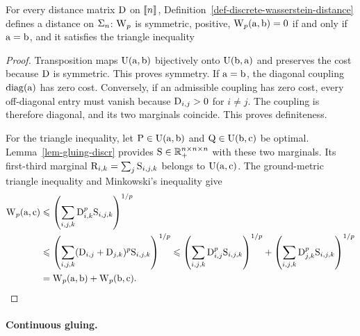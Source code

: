 \begin{prop}\label{prop-metric-histo}
	For every distance matrix $\mathrm{D}$ on $\llbracket n\rrbracket$, Definition~\ref{def-discrete-wasserstein-distance} defines a distance on $\Sigma_n$: $\operatorname{\mathrm{W}}_p$ is symmetric, positive, $\operatorname{\mathrm{W}}_p(\mathrm{a},\mathrm{b})=0$ if and only if $\mathrm{a} = \mathrm{b}$, and it satisfies the triangle inequality
\end{prop}

\begin{proof}
	Transposition maps $\mathrm{U}(\mathrm{a},\mathrm{b})$ bijectively onto $\mathrm{U}(\mathrm{b},\mathrm{a})$ and preserves the cost because $\mathrm{D}$ is symmetric. This proves symmetry. If $\mathrm{a}=\mathrm{b}$, the diagonal coupling $\operatorname{diag}(\mathrm{a})$ has zero cost. Conversely, if an admissible coupling has zero cost, every off-diagonal entry must vanish because $\mathrm{D}_{i,j}>0$ for $i\neq j$. The coupling is therefore diagonal, and its two marginals coincide. This proves definiteness.

	For the triangle inequality, let $\mathrm{P}\in\mathrm{U}(\mathrm{a},\mathrm{b})$ and $\mathrm{Q}\in\mathrm{U}(\mathrm{b},\mathrm{c})$ be optimal. Lemma~\ref{lem-gluing-discr} provides $\mathrm{S}\in\mathbb{R}_+^{n\times n\times n}$ with these two marginals. Its first-third marginal
	\(\mathrm{R}_{i,k}=\sum_j\mathrm{S}_{i,j,k}\)
	belongs to $\mathrm{U}(\mathrm{a},\mathrm{c})$. The ground-metric triangle inequality and Minkowski's inequality give
	\[
	\begin{aligned}
	\operatorname{\mathrm{W}}_p(\mathrm{a},\mathrm{c})
	&\leqslant \left(\sum_{i,j,k}\mathrm{D}_{i,k}^p\mathrm{S}_{i,j,k}\right)^{1/p}\\
	&\leqslant \left(\sum_{i,j,k}(\mathrm{D}_{i,j}+\mathrm{D}_{j,k})^p\mathrm{S}_{i,j,k}\right)^{1/p}
	\leqslant \left(\sum_{i,j,k}\mathrm{D}_{i,j}^p\mathrm{S}_{i,j,k}\right)^{1/p}
	+\left(\sum_{i,j,k}\mathrm{D}_{j,k}^p\mathrm{S}_{i,j,k}\right)^{1/p}\\
	&=\operatorname{\mathrm{W}}_p(\mathrm{a},\mathrm{b})+\operatorname{\mathrm{W}}_p(\mathrm{b},\mathrm{c}).
	\end{aligned}
	\]
\end{proof}

\paragraph{Continuous gluing.}

